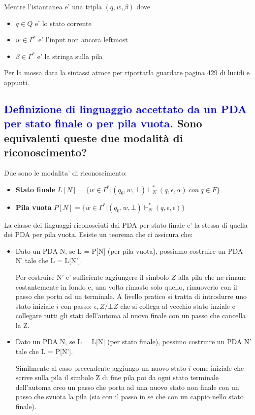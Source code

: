 \documentclass{article}
\begin{document}
Mentre l'istantanea e' una tripla $(q,w,\beta)$ dove

\begin{itemize}
    \item $q \in Q$ e' lo stato corrente
    \item $w\in\Gamma^*$ e' l'input non ancora leftmost
    \item $\beta\in\Gamma^*$ e' la stringa sulla pila
\end{itemize}
Per la mossa data la sintassi atroce per riportarla guardare pagina 429 di lucidi e appunti.

\subsection{\textcolor{blue}{Definizione di linguaggio accettato da un PDA per stato finale o per pila vuota.} Sono equivalenti queste due modalità di riconoscimento?}
Due sono le modalita' di riconoscimento:
\begin{itemize}
    \item \textbf{Stato finale} $L[N] = \{w\in\Gamma^*|(q_0,w,\bot)\vdash_N^*(q,\epsilon,\alpha)\ con\ q\in F \}$
    \item \textbf{Pila vuota} $P[N] = \{w\in\Gamma^*|(q_0,w,\bot)\vdash_N^*(q,\epsilon,\epsilon) \}$
\end{itemize}
La classe dei linguaggi riconosciuti dai PDA per stato finale e' la stessa di quella dei PDA per pila vuota.
Esiste un teorema che ci assicura che:
\begin{itemize}
    \item Dato un PDA N, se L = P[N] (per pila vuota), possiamo costruire un PDA N' tale
          che L = L[N'].

          Per costruire N' e' sufficiente aggiungere il simbolo $Z$ alla pila che ne
          rimane costantemente in fondo e, una volta rimasto solo quello, rimuoverlo con
          il passo che porta ad un terminale. A livello pratico si tratta di introdurre
          uno stato iniziale $i$ con passo: $\epsilon,Z/\bot Z$ che si collega al vecchio
          stato inziale e collegare tutti gli stati dell'automa al nuovo finale con un
          passo che cancella la Z.
    \item Dato un PDA N, se L = L[N] (per stato finale), possimo costruire un PDA N' tale
          che L = P[N'].

          Similmente al caso precendente aggiungo un nuovo stato $i$ come iniziale che
          scrive sulla pila il simbolo Z di fine pila poi da ogni stato terminale
          dell'automa creo un passo che porta ad una nuovo stato non finale con un passo
          che svuota la pila (sia con il passo in se che con un cappio nello stato
          finale).
\end{itemize}
\end{document}
